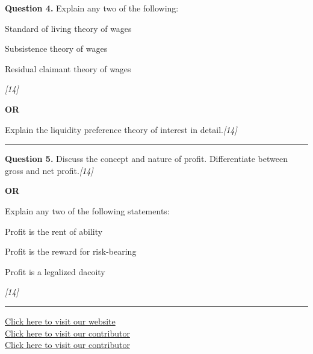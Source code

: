 \documentclass[11pt,a4paper]{article}
\newcommand{\pts}[1]{\hfill   \textit{[#1]}}
\begin{document}
\noindent   \textbf{Question 4.}
Explain any two of the following:

\begin{parts}
  \item Standard of living theory of wages
  \item Subsistence theory of wages
  \item Residual claimant theory of wages
\end{parts}\pts{14}

\centerline{   \textbf{OR}}

Explain the liquidity preference theory of interest in detail.\pts{14}

\medskip\rule{\linewidth}{0.2pt}




\noindent   \textbf{Question 5.}
Discuss the concept and nature of profit. Differentiate between gross and net profit.\pts{14}

\centerline{   \textbf{OR}}

Explain any two of the following statements:

\begin{parts}
  \item Profit is the rent of ability
  \item Profit is the reward for risk-bearing
  \item Profit is a legalized dacoity
\end{parts}\pts{14}

\vfill
\rule{\linewidth}{0.4pt}

\begin{center}\small
\href{https://bhu-exam.vercel.app/}{Click here to visit our website}\\[4pt]
\href{https://me-aryan.vercel.app/}{Click here to visit our contributor}\\[4pt]
\href{https://quashan-me.vercel.app/}{Click here to visit our contributor}
\end{center}
\end{document}
